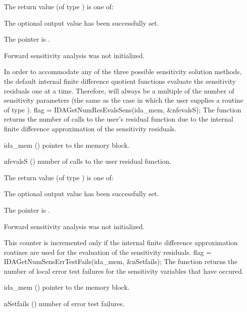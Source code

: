 {
  The return value  (of type ) is one of:
  \begin{args}
  \item[\Id{IDA\_SUCCESS}] 
    The optional output value has been successfully set.
  \item[\Id{IDA\_MEM\_NULL}]
    The  pointer is .
  \item[\Id{IDA\_NO\_SENS}]
    Forward sensitivity analysis was not initialized.
  \end{args}
}
{
  In order to accommodate any of the three possible sensitivity solution methods,
  the default internal 
  finite difference quotient functions evaluate the sensitivity residuals 
  one at a time. Therefore,  will always be a multiple of the
  number of sensitivity parameters (the same as the case in which the user supplies
  a routine of type ).
}
{
  flag = IDAGetNumResEvalsSens(ida\_mem, \&nfevalsS);
}
{
  The function  returns the number of calls to the
  user's residual function due to the internal finite difference approximation
  of the sensitivity residuals.
}
{
  \begin{args}
  \item[ida\_mem] ()
    pointer to the {\idas} memory block.
  \item[nfevalsS] ()
    number of calls to the user residual function.
  \end{args}
}
{
  The return value  (of type ) is one of:
  \begin{args}
  \item[\Id{IDA\_SUCCESS}] 
    The optional output value has been successfully set.
  \item[\Id{IDA\_MEM\_NULL}]
    The  pointer is .
  \item[\Id{IDA\_NO\_SENS}]
    Forward sensitivity analysis was not initialized.
  \end{args}
}
{
  This counter is incremented only if the internal finite difference approximation
  routines are used for the evaluation of the sensitivity residuals.
}
{
  flag = IDAGetNumSensErrTestFails(ida\_mem, \&nSetfails);
}
{
  The function  returns the number of local
  error test failures for the sensitivity variables that have occured.
}
{
  \begin{args}
  \item[ida\_mem] ()
    pointer to the {\idas} memory block.
  \item[nSetfails] ()
    number of error test failures.
  \end{args}
}
